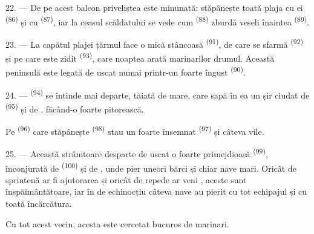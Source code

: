 22. --- De pe acest balcon priveliștea este minunată: stăpânește toată plaja cu
 ei \textsuperscript{(86)} și cu 
\textsuperscript{(87)}, iar la ceasul scăldatului se vede cum 
\textsuperscript{(88)} zburdă veseli înaintea 
\textsuperscript{(89)}.

23. --- La capătul plajei țărmul face o mică  stâncoasă
\textsuperscript{(91)}, de care se sfarmă 
\textsuperscript{(92)} și pe care este zidit  \textsuperscript{(93)},
care noaptea arată marinarilor drumul. Această peninsulă este legată de uscat numai
printr-un  foarte îngust \textsuperscript{(90)}.

\VUsaut{3.0mm}
\VUsaut{3.0mm}

24. ---  \textsuperscript{(94)} se întinde mai departe, tăiată de
mare, care sapă în ea un șir ciudat de  \textsuperscript{(95)} și
de , făcând-o foarte pitorească.

Pe  \textsuperscript{(96)} care stăpânește 
\textsuperscript{(98)} stau un  foarte însemnat \textsuperscript{(97)}
și câteva vile.

25. --- Această strâmtoare desparte de uscat o  foarte primejdioasă
\textsuperscript{(99)}, înconjurată de  \textsuperscript{(100)} și
de , unde pier uneori bărci și chiar nave mari. Oricât de sprintenă
ar fi ajutorarea și oricât de repede ar veni , aceste
 sunt înspăimântătoare, iar în  de echinocțiu
câteva nave au pierit cu tot echipajul și cu toată încărcătura.

Cu tot acest vecin,  acesta este cercetat bucuros de marinari.
\VUsaut{6.0mm}
\VUfilet{22mm}
